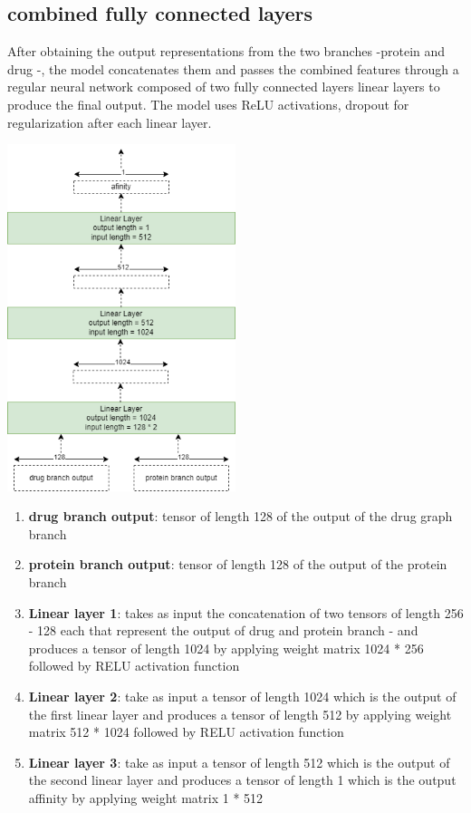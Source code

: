 \documentclass[11pt, a4paper]{article}
\begin{document}
    \subsection{combined fully connected layers}      
        After obtaining the output representations from the two branches -protein and drug -, the model concatenates them and passes the combined features through a regular neural network composed of two fully connected layers linear layers to produce the final output.
        The model uses ReLU activations, dropout for regularization after each linear layer.
        \begin{center}
            \includegraphics[width=0.5\textwidth]{model/Combined_representation.drawio.png}
        \end{center}

        \begin{enumerate}
            \item \textbf{drug branch output}: tensor of length 128 of the output of the drug graph branch
            \item \textbf{protein branch output}: tensor of length 128 of the output of the protein branch
            \item \textbf{Linear layer 1}: takes as input the concatenation of two tensors of length 256 - 128 each that represent the output of drug and protein branch - and produces a tensor of length 1024 by applying weight matrix 1024 * 256 followed by RELU activation function
            \item \textbf{Linear layer 2}: take as input a tensor of length 1024 which is the output of the first linear layer and produces a tensor of length 512 by applying weight matrix 512 * 1024 followed by RELU activation function
            \item \textbf{Linear layer 3}: take as input a tensor of length 512 which is the output of the second linear layer and produces a tensor of length 1 which is the output affinity by applying weight matrix 1 * 512 
        \end{enumerate} 
\end{document}
